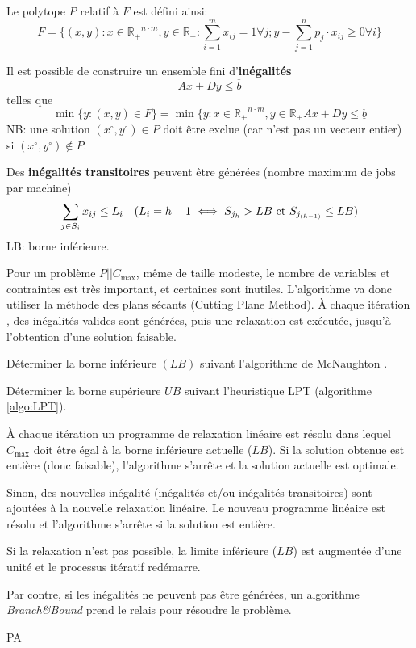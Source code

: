 \documentclass[a4paper,12pt]{report}
\theoremstyle{plain}				%
\theoremstyle{definition}				%
\newcommand\problemGrahamP{$P||C_{\max}$\xspace}
\newcommand{\lp}[1]{\todo[author=LP,color=yellow,inline]{#1}}
\begin{document}
Le polytope $P$ relatif à $F$ est défini ainsi:
\[
  F=\{ (x,y) : x \in \mathbb{R_+}^{n \cdot m}, y \in \mathbb{R_+} : \sum_{i=1}^{m} x_{ij}=1 \forall j;
  y-\sum_{j=1}^{n} p_j \cdot x_{ij} \geq 0 \forall i	\}
\]
\lp{Tu n'avais pas dit P?}

Il est possible de construire un ensemble fini d'\textbf{inégalités}
\[
  Ax+Dy \leq \overline{b}
\]
telles que
\[
  \min \{y : (x,y) \in F \} = \min \{y : x \in \mathbb{R_+}^{n \cdot m}, y \in \mathbb{R_+} Ax+Dy \leq \underline{b}
\]
NB: une solution
$(x \ensuremath{^\circ} , y\ensuremath{^\circ}) \in P$ doit être
exclue (car n'est pas un vecteur entier) si
$(x\ensuremath{^\circ}, y\ensuremath{^\circ}) \notin P $.

\bigskip

Des \textbf{inégalités transitoires} peuvent être générées (nombre
maximum de jobs par machine)
\[
  \sum_{j \in S_i} x_{ij} \leq L_i \quad (L_i = h-1 \iff S_{j_h} > LB
  \textnormal{ et } S_{j_{(h-1)}} \leq LB)
\]
LB: borne inférieure.

\bigskip

Pour un problème \problemGrahamP, même de taille modeste, le nombre de
variables et contraintes est très important, et certaines sont
inutiles.
L'algorithme va donc utiliser la méthode des plans sécants (Cutting
Plane Method).
\`A chaque itération , des inégalités valides sont générées, puis une
relaxation est exécutée, jusqu'à l'obtention d'une solution faisable.

\bigskip
\begin{algorithm}[H]
\DontPrintSemicolon

Déterminer la borne inférieure $(LB)$ suivant l'algorithme de
McNaughton \cite{mcnaughton1959scheduling}.\;

Déterminer la borne supérieure $UB$ suivant l'heuristique LPT
(algorithme \ref{algo:LPT}).\;


À chaque itération un programme de relaxation linéaire est résolu dans
lequel $C_{\max}$ doit être égal à la borne inférieure actuelle
($LB$).
Si la solution obtenue est entière (donc faisable), l'algorithme
s'arrête et la solution actuelle est optimale.\;

Sinon, des nouvelles inégalité (inégalités et/ou inégalités
transitoires) sont ajoutées à la nouvelle relaxation linéaire. Le
nouveau programme linéaire est résolu et l'algorithme s'arrête si la
solution est entière.\;

Si la relaxation n'est pas possible, la limite inférieure ($LB$) est
augmentée d'une unité et le processus itératif redémarre.\;

Par contre, si les inégalités ne peuvent pas être générées, un
algorithme \emph{Branch\&Bound} prend le relais pour résoudre le
problème.\;
\caption{PA\label{algo:PA}}
\end{algorithm}
\end{document}

